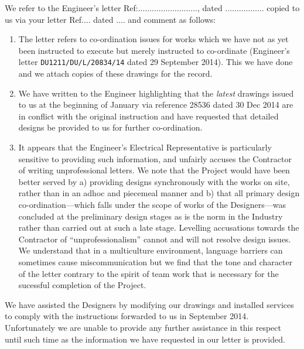 \documentclass[twoside]{book}
\begin{document}
\arial

We refer to the Engineer’s letter Ref:.........................., dated .................  copied to us via your letter Ref.... dated ....
and comment as follows:

\begin{enumerate}
\item The letter refers to co-ordination issues for works which we have not as yet been instructed to
execute but merely instructed to co-ordinate (Engineer’s letter \texttt{DU1211/DU/L/20834/14} dated 29 September 2014). This we have done and we attach copies of these drawings for the record. 

\item We have written to the Engineer highlighting that the \textit{latest} drawings issued to us at the beginning of January via reference 28536 dated 30 Dec 2014  are in conflict with the original instruction and have requested that detailed designs be provided to us for further co-ordination.
\item It appears that the Engineer’s Electrical Representative is particularly sensitive to providing such information, and unfairly accuses the Contractor of writing unprofessional letters. We note that the Project would have been better served by a) providing designs synchronously with the works on site, rather than in an adhoc and piecemeal manner and b) that all primary design co-ordination---which falls under the scope of works of the Designers---was concluded at the preliminary design stages as is the norm in the Industry rather than carried out at such a late stage.
Levelling accusations towards the Contractor of “unprofessionalism” cannot and will not resolve design issues. We understand that in a multiculture environment, language barriers can sometimes cause miscommunication but we find that the tone and character of the letter contrary to the spirit of team work that is necessary for the sucessful completion of the Project.
\end{enumerate}

We have assisted the Designers by modifying our drawings and installed services to comply with the instructions forwarded to us in September 2014. Unfortunately we are unable to provide any further assistance in this respect until such time as the information we have requested in our letter is provided.
\end{document}
